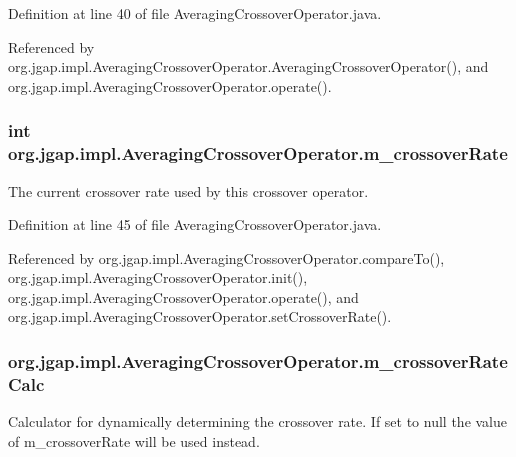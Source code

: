 Definition at line 40 of file Averaging\-Crossover\-Operator.\-java.



Referenced by org.\-jgap.\-impl.\-Averaging\-Crossover\-Operator.\-Averaging\-Crossover\-Operator(), and org.\-jgap.\-impl.\-Averaging\-Crossover\-Operator.\-operate().

\hypertarget{classorg_1_1jgap_1_1impl_1_1_averaging_crossover_operator_ab3cb82ebc4ff8b1a325bf347105621d5}{
\subsubsection[{m\-\_\-crossover\-Rate}]{\setlength{\rightskip}{0pt plus 5cm}int org.\-jgap.\-impl.\-Averaging\-Crossover\-Operator.\-m\-\_\-crossover\-Rate\hspace{0.3cm}{\ttfamily [private]}}}\label{classorg_1_1jgap_1_1impl_1_1_averaging_crossover_operator_ab3cb82ebc4ff8b1a325bf347105621d5}
The current crossover rate used by this crossover operator. 

Definition at line 45 of file Averaging\-Crossover\-Operator.\-java.



Referenced by org.\-jgap.\-impl.\-Averaging\-Crossover\-Operator.\-compare\-To(), org.\-jgap.\-impl.\-Averaging\-Crossover\-Operator.\-init(), org.\-jgap.\-impl.\-Averaging\-Crossover\-Operator.\-operate(), and org.\-jgap.\-impl.\-Averaging\-Crossover\-Operator.\-set\-Crossover\-Rate().

\hypertarget{classorg_1_1jgap_1_1impl_1_1_averaging_crossover_operator_a4f84d3a8075f22f84f42db7f2faa66f0}{
\subsubsection[{m\-\_\-crossover\-Rate\-Calc}]{ org.\-jgap.\-impl.\-Averaging\-Crossover\-Operator.\-m\-\_\-crossover\-Rate\-Calc\hspace{0.3cm}{\ttfamily [private]}}}\label{classorg_1_1jgap_1_1impl_1_1_averaging_crossover_operator_a4f84d3a8075f22f84f42db7f2faa66f0}
Calculator for dynamically determining the crossover rate. If set to null the value of m\-\_\-crossover\-Rate will be used instead. 

